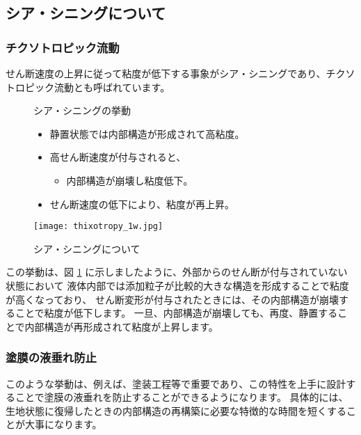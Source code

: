 \documentclass[uplatex,dvipdfmx,a4paper,11pt]{jsarticle}
\begin{document}
\subsection{シア・シニングについて}

\subsubsection{チクソトロピック流動}
せん断速度の上昇に従って粘度が低下する事象がシア・シニングであり、チクソトロピック流動とも呼ばれています。
\begin{figure}[htb]
	\begin{center}
		\begin{minipage}{0.45\textwidth}
			\begin{itembox}[l]{シア・シニングの挙動}
				\begin{itemize}
					\item 静置状態では内部構造が形成されて高粘度。
					\item 高せん断速度が付与されると、
					\begin{itemize}
						\item 内部構造が崩壊し粘度低下。
					\end{itemize}
					\item せん断速度の低下により、粘度が再上昇。
				\end{itemize}
			\end{itembox}
		\end{minipage}
		\begin{minipage}{0.45\textwidth}
			\begin{center}
			\texttt{[image: thixotropy\_1w.jpg]}
			\end{center}
		\end{minipage}
		\caption{シア・シニングについて}
		\label{fig:shear_thinning}
	\end{center}
\end{figure}
この挙動は、図 \ref{fig:shear_thinning} に示しましたように、外部からのせん断が付与されていない状態において
液体内部では添加粒子が比較的大きな構造を形成することで粘度が高くなっており、
せん断変形が付与されたときには、その内部構造が崩壊することで粘度が低下します。
一旦、内部構造が崩壊しても、再度、静置することで内部構造が再形成されて粘度が上昇します。

\subsubsection{塗膜の液垂れ防止}
このような挙動は、例えば、塗装工程等で重要であり、この特性を上手に設計することで塗膜の液垂れを防止することができるようになります。
具体的には、生地状態に復帰したときの内部構造の再構築に必要な特徴的な時間を短くすることが大事になります。
\end{document}
